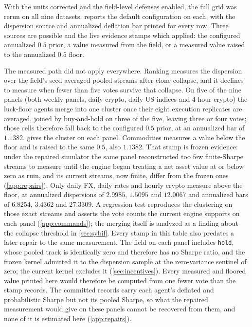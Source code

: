 With the units corrected and the field-level defenses enabled, the full grid was rerun on all nine datasets.  reports the default configuration on each, with the dispersion source and annualized deflation bar printed for every row. Three sources are possible and the live evidence stamps which applied: the configured annualized $0.5$ prior, a value measured from the field, or a measured value raised to the annualized $0.5$ floor.

The measured path did not apply everywhere. Ranking measures the dispersion over the field's seed-averaged pooled streams after clone collapse, and it declines to measure when fewer than five votes survive that collapse. On five of the nine panels (both weekly panels, daily crypto, daily US indices and 4-hour crypto) the luck-floor agents merge into one cluster once their eight execution replicates are averaged, joined by buy-and-hold on three of the five, leaving three or four votes; those cells therefore fall back to the configured $0.5$ prior, at an annualized bar of $1.1382$.  gives the cluster on each panel. Commodities measures a value below the floor and is raised to the same $0.5$, also $1.1382$. That stamp is frozen evidence: under the repaired simulator the same panel reconstructed too few finite-Sharpe streams to measure until the engine began treating a net asset value at or below zero as ruin, and its current streams, now finite, differ from the frozen ones (\cref{app:repairs}). Only daily FX, daily rates and hourly crypto measure above the floor, at annualized dispersions of $2.9985$, $1.5095$ and $12.0067$ and annualized bars of $6.8254$, $3.4362$ and $27.3309$. A regression test reproduces the clustering on those exact streams and asserts the vote counts the current engine supports on each panel (\cref{app:commands}); the merging itself is analyzed as a finding about the collapse threshold in \cref{sec:sybil}. Every stamp in this table also predates a later repair to the same measurement. The field on each panel includes \texttt{hold}, whose pooled track is identically zero and therefore has no Sharpe ratio, and the frozen kernel admitted it to the dispersion sample at the zero-variance sentinel of zero; the current kernel excludes it (\cref{sec:incentives}). Every measured and floored value printed here would therefore be computed from one fewer vote than the stamp records. The committed records carry each agent's deflated and probabilistic Sharpe but not its pooled Sharpe, so what the repaired measurement would give on these panels cannot be recovered from them, and none of it is estimated here (\cref{app:repairs}).

